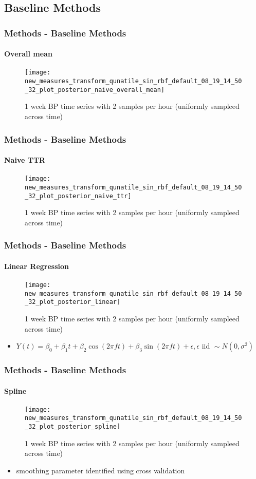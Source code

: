 \documentclass[
	8pt, %
]{beamer}
\begin{document}
\subsection{Baseline Methods}

\begin{frame}
	\frametitle{Methods - Baseline Methods}
	\framesubtitle{Overall mean}

		\begin{figure}
			\texttt{[image: new\_measures\_transform\_qunatile\_sin\_rbf\_default\_08\_19\_14\_50\_32\_plot\_posterior\_naive\_overall\_mean]}
			\caption{1 week BP time series with 2 samples per hour (uniformly sampleed across time)}
		\end{figure}

\end{frame}

\begin{frame}
	\frametitle{Methods - Baseline Methods}
	\framesubtitle{Naive TTR}
		\begin{figure}
			\texttt{[image: new\_measures\_transform\_qunatile\_sin\_rbf\_default\_08\_19\_14\_50\_32\_plot\_posterior\_naive\_ttr]}
			\caption{1 week BP time series with 2 samples per hour (uniformly sampleed across time)}
		\end{figure}

\end{frame}

\begin{frame}
	\frametitle{Methods - Baseline Methods}
	\framesubtitle{Linear Regression}
		\begin{figure}
			\texttt{[image: new\_measures\_transform\_qunatile\_sin\_rbf\_default\_08\_19\_14\_50\_32\_plot\_posterior\_linear]}
			\caption{1 week BP time series with 2 samples per hour (uniformly sampleed across time)}
		\end{figure}

	\begin{itemize}
		\item $Y(t) = \beta_0 + \beta_1 t + \beta_2 \cos(2 \pi f t) + \beta_3 \sin(2 \pi f t) + \epsilon, \epsilon \text{ iid } \sim N(0, \sigma^2)$
	\end{itemize}

\end{frame}

\begin{frame}
	\frametitle{Methods - Baseline Methods}
	\framesubtitle{Spline}
		\begin{figure}
			\texttt{[image: new\_measures\_transform\_qunatile\_sin\_rbf\_default\_08\_19\_14\_50\_32\_plot\_posterior\_spline]}
			\caption{1 week BP time series with 2 samples per hour (uniformly sampleed across time)}
		\end{figure}

	\begin{itemize}
		\item smoothing parameter identified using cross validation
	\end{itemize}

\end{frame}
\end{document}
